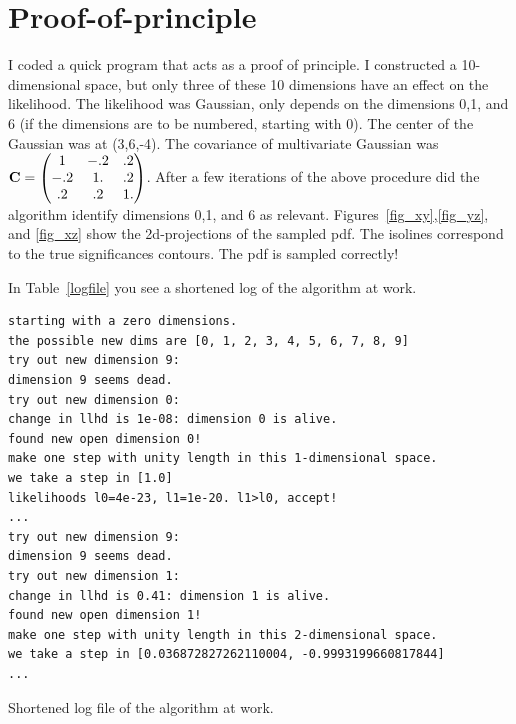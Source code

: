 \documentclass[11pt,singleside,a4paper,makeidx,notitlepage]{article}
\begin{document}
\section{Proof-of-principle}
I coded a quick program that acts as a proof of principle. I constructed a
10-dimensional space, but only three of these 10 dimensions have an effect
on the likelihood. The likelihood was Gaussian, only depends on the
dimensions 0,1, and 6  (if the dimensions are to be numbered, starting with
0). The center of the Gaussian was at (3,6,-4). The covariance of multivariate
Gaussian was ${\bf C}=\left( \begin{matrix} 1 & -.2 & .2 \\ -.2 & 1. & .2 \\
.2 & .2 & 1. \end{matrix} \right)$. 
After a few iterations of the above procedure did the algorithm identify
dimensions 0,1, and 6 as relevant. Figures~\ref{fig_xy},\ref{fig_yz}, and \ref{fig_xz} show the
2d-projections of the sampled pdf. The isolines correspond to the true
significances contours. The pdf is sampled correctly! 

In Table~\ref{logfile} you see a shortened log of the algorithm at work.

\begin{table}
\begin{verbatim}
starting with a zero dimensions.
the possible new dims are [0, 1, 2, 3, 4, 5, 6, 7, 8, 9]                                      
try out new dimension 9:                                                                      
dimension 9 seems dead.                                                                       
try out new dimension 0:                                                                      
change in llhd is 1e-08: dimension 0 is alive.                                                
found new open dimension 0!                                                                   
make one step with unity length in this 1-dimensional space.                                  
we take a step in [1.0]                           
likelihoods l0=4e-23, l1=1e-20. l1>l0, accept!
...
try out new dimension 9:                                                                      
dimension 9 seems dead.                                                                       
try out new dimension 1:                                                                      
change in llhd is 0.41: dimension 1 is alive.                                                 
found new open dimension 1!                                                                   
make one step with unity length in this 2-dimensional space.                                  
we take a step in [0.036872827262110004, -0.9993199660817844]  
...
\end{verbatim}
\caption{Shortened log file of the algorithm at work.}
\label{logfile}
\end{table}
\end{document}
